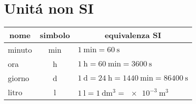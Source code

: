 \section{Unit\'a non SI}
{\centering{}
	\begin{tabular}{lcl}
		\toprule 
		\multicolumn{1}{c}{nome}&simbolo&\multicolumn{1}{c}{equivalenza SI}\\
		\midrule
		minuto&\si{\minute}&$\SI{1}{\minute}=\SI{60}{\second}$\\
		ora&\si{\hour}&$\SI{1}{\hour}=\SI{60}{\minute}=\SI{3600}{\second}$\\
		giorno&\si{\day}&$\SI{1}{\day}=\SI{24}{\hour}=\SI{1440}{\minute} = \SI{86400}{\second}$\\
		litro&\si{\litre}&$\SI{1}{\litre}=\SI{1}{\deci\metre\tothe{3}}=\SI{e-3}{\metre\tothe{3}}$\\
		\bottomrule
	\end{tabular}\par}
\newpage
